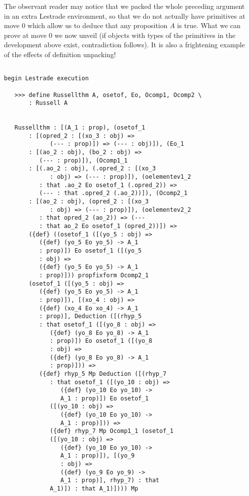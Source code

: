 \documentclass[12pt]{article}
\begin{document}
The observant reader may notice that we packed the whole preceding argument in an extra Lestrade environment, so that we do not actually have primitives at move 0 which allow us to deduce that any proposition $A$ is true.  What we can prove at move 0 we now unveil (if objects with types of the primitives in the development above exist, contradiction follows).  It is also a frightening example of the effects of definition unpacking!

\begin{verbatim}

begin Lestrade execution

   >>> define Russellthm A, osetof, Eo, Ocomp1, Ocomp2 \
       : Russell A


   Russellthm : [(A_1 : prop), (osetof_1 
       : [(opred_2 : [(xo_3 : obj) => 
             (--- : prop)]) => (--- : obj)]), (Eo_1 
       : [(ao_2 : obj), (bo_2 : obj) => 
          (--- : prop)]), (Ocomp1_1 
       : [(.ao_2 : obj), (.opred_2 : [(xo_3 
             : obj) => (--- : prop)]), (oelementev1_2 
          : that .ao_2 Eo osetof_1 (.opred_2)) => 
          (--- : that .opred_2 (.ao_2))]), (Ocomp2_1 
       : [(ao_2 : obj), (opred_2 : [(xo_3 
             : obj) => (--- : prop)]), (oelementev2_2 
          : that opred_2 (ao_2)) => (--- 
          : that ao_2 Eo osetof_1 (opred_2))]) => 
       ({def} ((osetof_1 ([(yo_5 : obj) => 
          ({def} (yo_5 Eo yo_5) -> A_1 
          : prop)]) Eo osetof_1 ([(yo_5 
          : obj) => 
          ({def} (yo_5 Eo yo_5) -> A_1 
          : prop)])) propfixform Ocomp2_1 
       (osetof_1 ([(yo_5 : obj) => 
          ({def} (yo_5 Eo yo_5) -> A_1 
          : prop)]), [(xo_4 : obj) => 
          ({def} (xo_4 Eo xo_4) -> A_1 
          : prop)], Deduction ([(rhyp_5 
          : that osetof_1 ([(yo_8 : obj) => 
             ({def} (yo_8 Eo yo_8) -> A_1 
             : prop)]) Eo osetof_1 ([(yo_8 
             : obj) => 
             ({def} (yo_8 Eo yo_8) -> A_1 
             : prop)])) => 
          ({def} rhyp_5 Mp Deduction ([(rhyp_7 
             : that osetof_1 ([(yo_10 : obj) => 
                ({def} (yo_10 Eo yo_10) -> 
                A_1 : prop)]) Eo osetof_1 
             ([(yo_10 : obj) => 
                ({def} (yo_10 Eo yo_10) -> 
                A_1 : prop)])) => 
             ({def} rhyp_7 Mp Ocomp1_1 (osetof_1 
             ([(yo_10 : obj) => 
                ({def} (yo_10 Eo yo_10) -> 
                A_1 : prop)]), [(yo_9 
                : obj) => 
                ({def} (yo_9 Eo yo_9) -> 
                A_1 : prop)], rhyp_7) : that 
             A_1)]) : that A_1)]))) Mp 

\end{verbatim}
\end{document}
